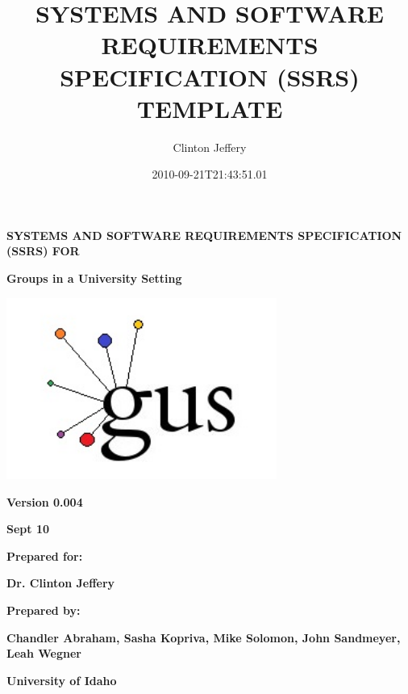 \documentclass[letterpaper]{article}
\title{SYSTEMS AND SOFTWARE REQUIREMENTS SPECIFICATION (SSRS) TEMPLATE}
\author{Clinton Jeffery}
\date{2010-09-21T21:43:51.01}
\begin{document}
\clearpage\clearpage\setcounter{page}{1}\pagestyle{MP}
\thispagestyle{MPF}
{\centering\bfseries\color{black}
SYSTEMS AND SOFTWARE REQUIREMENTS SPECIFICATION (SSRS) FOR
\par}


\bigskip

{\centering\bfseries\color{black}
Groups in a University Setting
\par}


\bigskip

{\centering 
\includegraphics[width=3.4882in,height=2.3374in]{Gusspec-img1.jpg}
\par}


\bigskip


\bigskip


\bigskip

{\centering\bfseries\color{black}
Version 0.004
\par}

{\centering\bfseries\color{black}
Sept 10
\par}


\bigskip


\bigskip

{\centering\bfseries\color{black}
Prepared for:
\par}

{\centering\bfseries\color{black}
Dr. Clinton Jeffery
\par}


\bigskip


\bigskip

{\centering\bfseries\color{black}
Prepared by:
\par}

{\centering\bfseries\color{black}
Chandler Abraham, Sasha Kopriva, Mike Solomon, John Sandmeyer, Leah Wegner
\par}

{\centering\bfseries\color{black}
University of Idaho
\par}
\end{document}
